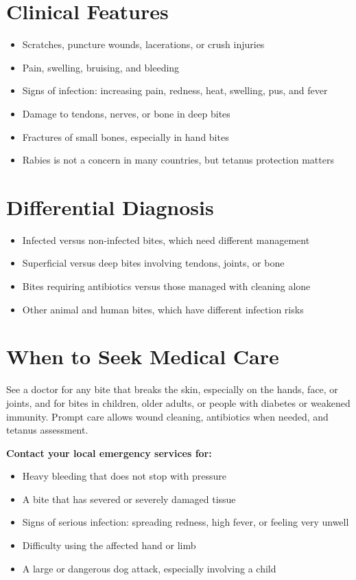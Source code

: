 \section*{Clinical Features}
\begin{itemize}
    \item Scratches, puncture wounds, lacerations, or crush injuries
    \item Pain, swelling, bruising, and bleeding
    \item Signs of infection: increasing pain, redness, heat, swelling, pus, and fever
    \item Damage to tendons, nerves, or bone in deep bites
    \item Fractures of small bones, especially in hand bites
    \item Rabies is not a concern in many countries, but tetanus protection matters
\end{itemize}

\section*{Differential Diagnosis}
\begin{itemize}
    \item Infected versus non-infected bites, which need different management
    \item Superficial versus deep bites involving tendons, joints, or bone
    \item Bites requiring antibiotics versus those managed with cleaning alone
    \item Other animal and human bites, which have different infection risks
\end{itemize}

\section*{When to Seek Medical Care}
See a doctor for any bite that breaks the skin, especially on the hands, face, or joints, and for bites in children, older adults, or people with diabetes or weakened immunity. Prompt care allows wound cleaning, antibiotics when needed, and tetanus assessment.

\textbf{Contact your local emergency services for:}
\begin{itemize}
    \item Heavy bleeding that does not stop with pressure
    \item A bite that has severed or severely damaged tissue
    \item Signs of serious infection: spreading redness, high fever, or feeling very unwell
    \item Difficulty using the affected hand or limb
    \item A large or dangerous dog attack, especially involving a child
\end{itemize}

